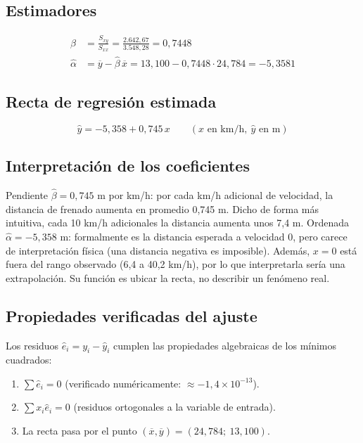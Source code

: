 \documentclass[12pt,a4paper]{article}
\begin{document}
\subsection{Estimadores}

\begin{align}
\hat{\beta} &= \frac{S_{xy}}{S_{xx}} = \frac{2.642{,}67}{3.548{,}28} = 0{,}7448 \\[4pt]
\hat{\alpha} &= \overline{y} - \hat{\beta}\,\overline{x} = 13{,}100 - 0{,}7448 \cdot 24{,}784 = -5{,}3581
\end{align}

\subsection{Recta de regresión estimada}

\begin{equation}
\boxed{\hat{y} = -5{,}358 + 0{,}745\,x} \qquad (x \text{ en km/h},\ \hat{y} \text{ en m})
\end{equation}

\subsection{Interpretación de los coeficientes}

Pendiente $\hat{\beta} = 0{,}745$ m por km/h: por cada km/h adicional de velocidad, la distancia de frenado aumenta en promedio 0{,}745 m. Dicho de forma más intuitiva, cada 10 km/h adicionales la distancia aumenta unos 7{,}4 m.
Ordenada $\hat{\alpha} = -5{,}358$ m: formalmente es la distancia esperada a velocidad 0, pero carece de interpretación física (una distancia negativa es imposible). Además, $x = 0$ está fuera del rango observado (6{,}4 a 40{,}2 km/h), por lo que interpretarla sería una extrapolación. Su función es ubicar la recta, no describir un fenómeno real.


\subsection{Propiedades verificadas del ajuste}

Los residuos $\hat{e}_i = y_i - \hat{y}_i$ cumplen las propiedades algebraicas de los mínimos cuadrados:
\begin{enumerate}
  \item $\sum \hat{e}_i = 0$ (verificado numéricamente: $\approx -1{,}4 \times 10^{-13}$).
  \item $\sum x_i \hat{e}_i = 0$ (residuos ortogonales a la variable de entrada).
  \item La recta pasa por el punto $(\overline{x}, \overline{y}) = (24{,}784;\ 13{,}100)$.
\end{enumerate}
\end{document}
